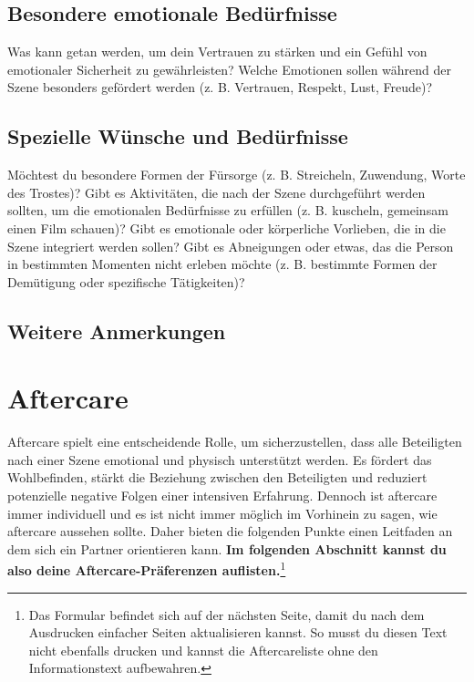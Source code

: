 \documentclass[a4paper,12pt]{article}
\begin{document}
\subsection{Besondere emotionale Bedürfnisse}
\noindent Was kann getan werden, um dein Vertrauen zu stärken und ein Gefühl von emotionaler Sicherheit zu gewährleisten? Welche Emotionen sollen während der Szene besonders gefördert werden (z. B. Vertrauen, Respekt, Lust, Freude)?\newline
\noindent \TextField[name=WahrBeson,multiline=true,height=10em, width=37em]{}

\newpage 

\subsection{Spezielle Wünsche und Bedürfnisse}
\noindent Möchtest du besondere Formen der Fürsorge (z. B. Streicheln, Zuwendung, Worte des Trostes)? Gibt es Aktivitäten, die nach der Szene durchgeführt werden sollten, um die emotionalen Bedürfnisse zu erfüllen (z. B. kuscheln, gemeinsam einen Film schauen)? Gibt es emotionale oder körperliche Vorlieben, die in die Szene integriert werden sollen? Gibt es Abneigungen oder etwas, das die Person in bestimmten Momenten nicht erleben möchte (z. B. bestimmte Formen der Demütigung oder spezifische Tätigkeiten)?
\noindent \TextField[name=WahrWuenSpez,multiline=true,height=10em, width=37em]{}

\subsection{Weitere Anmerkungen}
\noindent \TextField[name=WahrAnmMisc,multiline=true,height=20em, width=37em]{}


\newpage
\section{Aftercare}
Aftercare spielt eine entscheidende Rolle, um sicherzustellen, dass alle Beteiligten nach einer Szene emotional und physisch unterstützt werden. Es fördert das Wohlbefinden, stärkt die Beziehung zwischen den Beteiligten und reduziert potenzielle negative Folgen einer intensiven Erfahrung. Dennoch ist aftercare immer individuell und es ist nicht immer möglich im Vorhinein zu sagen, wie aftercare aussehen sollte. Daher bieten die folgenden Punkte einen Leitfaden an dem sich ein Partner orientieren kann.
\textbf{Im folgenden Abschnitt kannst du also deine Aftercare-Präferenzen auflisten.}\footnote{Das Formular befindet sich auf der nächsten Seite, damit du nach dem Ausdrucken einfacher Seiten aktualisieren kannst. So musst du diesen Text nicht ebenfalls drucken und kannst die Aftercareliste ohne den Informationstext aufbewahren.}
\newpage
\end{document}
